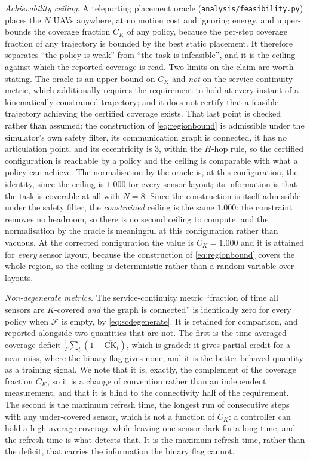 \documentclass[conference]{IEEEtran}
\begin{document}
\emph{Achievability ceiling.} A teleporting placement oracle
(\texttt{analysis/feasibility.py}) places the $N$ UAVs anywhere, at no
motion cost and ignoring energy, and upper-bounds the coverage fraction
$C_K$ of any policy, because the per-step coverage fraction of any
trajectory is bounded by the best static placement.  It therefore separates
``the policy is weak'' from ``the task is infeasible'', and it is the
ceiling against which the reported coverage is read.  Two limits on the
claim are worth stating.  The oracle is an upper bound on $C_K$ and \emph{not}
on the service-continuity metric, which additionally requires the
requirement to hold at every instant of a kinematically constrained
trajectory; and it does not certify that a feasible trajectory achieving the
certified coverage exists.  That last point is checked rather than
assumed: the construction of \eqref{eq:regionbound} is admissible under
the simulator's own safety filter, its communication graph is connected,
it has no articulation point, and its eccentricity is $3$, within the
$H$-hop rule, so the certified configuration is reachable by a policy
and the ceiling is comparable with what a policy can achieve.  The
normalisation by the oracle is, at this configuration, the identity, since
the ceiling is $1.000$ for every sensor layout; its information is that the
task is coverable at all with $N=8$. Since the construction is itself
admissible under the safety filter, the \emph{constrained} ceiling is
the same $1.000$: the constraint removes no headroom, so there is no
second ceiling to compute, and the normalisation by the oracle is
meaningful at this configuration rather than vacuous.  At the corrected configuration the value is
$C_K=1.000$ and it is attained for \emph{every} sensor layout, because the
construction of \eqref{eq:regionbound} covers the whole region, so the
ceiling is deterministic rather than a random variable over layouts.

\emph{Non-degenerate metrics.} The service-continuity metric
``fraction of time all sensors are $K$-covered \emph{and} the graph is
connected'' is identically zero for every policy when $\mathcal{F}$ is
empty, by \eqref{eq:scdegenerate}.  It is retained for comparison, and
reported alongside two quantities that are not.  The first is the
time-averaged coverage deficit $\frac1T\sum_t(1-\overline{\mathrm{CK}}_t)$,
which is graded: it gives partial credit for a near miss, where the binary
flag gives none, and it is the better-behaved quantity as a training
signal.  We note that it is, exactly, the complement of the coverage
fraction $C_K$, so it is a change of convention rather than an independent
measurement, and that it is blind to the connectivity half of the
requirement.  The second is the maximum refresh time, the longest run of
consecutive steps with any under-covered sensor, which is not a function of
$C_K$: a controller can hold a high average coverage while leaving one
sensor dark for a long time, and the refresh time is what detects that.  It
is the maximum refresh time, rather than the deficit, that carries the
information the binary flag cannot.
\end{document}
